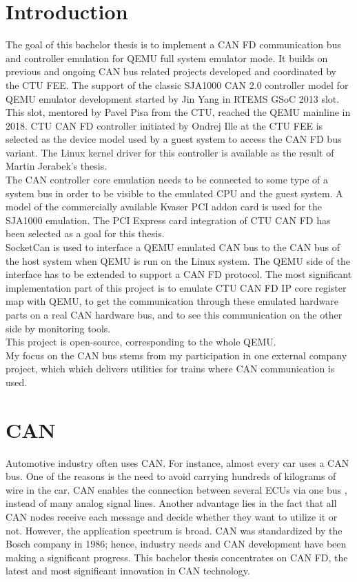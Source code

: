 \documentclass{ctuthesis}
\begin{document}
\chapter{Introduction}
 The goal of this bachelor thesis is to implement a CAN FD communication bus and controller emulation for QEMU full system emulator mode. It builds on previous and ongoing CAN bus related projects developed and coordinated by the CTU FEE. The support of the classic SJA1000 CAN 2.0 controller model for QEMU emulator development started by Jin Yang in RTEMS GSoC 2013 slot. This slot, mentored by Pavel Pisa from the CTU, reached the QEMU mainline in 2018. \cite{qemu-mainline} CTU CAN FD controller \cite{ctu-canfd-core} initiated by Ondrej Ille at the CTU FEE is selected as the device model used by a guest system to access the CAN FD bus variant. The Linux kernel driver for this controller is available as the result of Martin Jerabek's thesis. \cite{ctu-canfd} \\
 The CAN controller core emulation needs to be connected to some type of a system bus in order to be visible to the emulated CPU and the guest system. A model of the commercially available Kvaser PCI addon card is used for the SJA1000 emulation. The PCI Express card integration of CTU CAN FD \cite{ctu-project} has been selected as a goal for this thesis. \\
 SocketCan is used to interface a QEMU emulated CAN bus to the CAN bus of the host system when QEMU is run on the Linux system. The QEMU side of the interface has to be extended to support a CAN FD protocol.
The most significant implementation part of this project is to emulate CTU CAN FD IP core register map \cite{progdum} with QEMU, to get the communication through these emulated hardware parts on a real CAN hardware bus, and to see this communication on the other side by monitoring tools. \\
This project is open-source, corresponding to the whole QEMU. \\
My focus on the CAN bus stems from my participation in one external company project, which which delivers utilities for trains where CAN communication is used.

\chapter{CAN}
 Automotive industry often uses CAN.  For instance, almost every car uses a CAN bus. One of the reasons is the need to avoid carrying hundreds of kilograms of wire in the car. CAN enables the connection between several ECUs via one bus \cite{ECUs}, instead of many analog signal lines. Another advantage lies in the fact that all CAN nodes receive each message and decide whether they want to utilize it or not. However, the application spectrum is broad. CAN was standardized by the Bosch company in 1986; hence, industry needs and CAN development have been making a significant progress. This bachelor thesis concentrates on CAN FD, the latest and most significant innovation in CAN technology.
\end{document}
